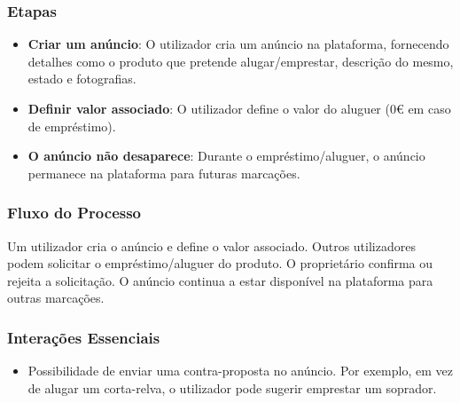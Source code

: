 \documentclass[a4paper, 12pt]{article} %
\begin{document}
\subsubsection{Etapas}
\begin{itemize}
	\item \textbf{Criar um anúncio}: O utilizador cria um anúncio na plataforma, fornecendo detalhes como o produto que pretende alugar/emprestar, descrição do mesmo, estado e fotografias.
	\item \textbf{Definir valor associado}: O utilizador define o valor do aluguer (0€ em caso de empréstimo).
	\item \textbf{O anúncio não desaparece}: Durante o empréstimo/aluguer, o anúncio permanece na plataforma para futuras marcações.
\end{itemize}

\subsubsection{Fluxo do Processo}

Um utilizador cria o anúncio e define o valor associado. Outros utilizadores podem solicitar o empréstimo/aluguer do produto. O proprietário confirma ou rejeita a solicitação. O anúncio continua a estar disponível na plataforma para outras marcações.

\subsubsection{Interações Essenciais}
\begin{itemize}
	\item Possibilidade de enviar uma contra-proposta no anúncio. Por exemplo, em vez de alugar um corta-relva, o utilizador pode sugerir emprestar um soprador.
\end{itemize}
\end{document}
